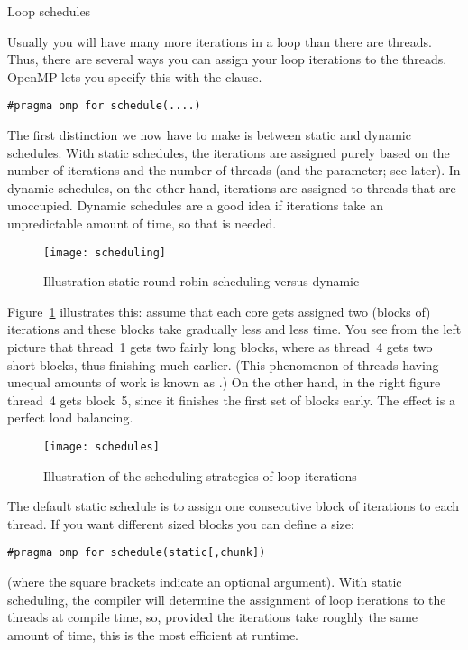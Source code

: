  {Loop schedules}
\label{sec:schedule}

Usually you will have many more iterations in a loop than there are threads.
Thus, there are several ways you can assign your loop iterations to the threads.
OpenMP lets you specify this with the  clause.
\begin{lstlisting}
#pragma omp for schedule(....)
\end{lstlisting}

The first distinction we now have to make is between static and dynamic schedules.
With static schedules, the iterations are assigned purely based on the number
of iterations and the number of threads (and the  parameter; see later).
In dynamic schedules, on the other hand, iterations are assigned to threads that
are unoccupied. Dynamic schedules are a good idea if iterations take an unpredictable
amount of time, so that  is needed.

\begin{figure}[ht]
  \texttt{[image: scheduling]}
  \caption{Illustration static round-robin scheduling versus dynamic}
  \label{fig:omp-robin}
\end{figure}
%
Figure~\ref{fig:omp-robin} illustrates this: assume that each core
gets assigned two (blocks of) iterations and these blocks take
gradually less and less time. You see from the left picture that
thread~1 gets two fairly long blocks, where as thread~4 gets two short
blocks, thus finishing much earlier. (This phenomenon of threads
having unequal amounts of work is known as .) On the other hand, in the right figure thread~4 gets
block~5, since it finishes the first set of blocks early. The effect
is a perfect load balancing.

\begin{figure}[ht]
  \texttt{[image: schedules]}
  \caption{Illustration of the scheduling strategies of loop iterations}
  \label{fig:omp-schedule}
\end{figure}

The default static schedule is to assign one consecutive block of
iterations to each thread. If you want different sized blocks you can
define a  size:
\begin{lstlisting}
#pragma omp for schedule(static[,chunk])
\end{lstlisting}
(where the square brackets indicate an optional argument).
With static scheduling,
the compiler will determine the assignment of loop iterations to the threads
at compile time,
so,
provided the iterations take roughly the same amount of time,
this is the most efficient at runtime.

